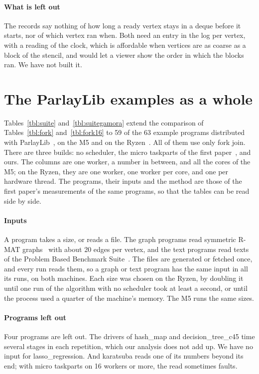 \documentclass[sigplan,nonacm]{acmart}
\begin{document}
\paragraph{What is left out}
%
The records say nothing of how long a ready vertex stays in a deque
before it starts, nor of which vertex ran when.
%
Both need an entry in the log per vertex, with a reading of the
clock, which is affordable when vertices are as coarse as a block of
the stencil, and would let a viewer show the order in which the
blocks ran.
%
We have not built it.


\section{The ParlayLib examples as a whole}
\label{sec:suite}

Tables~\ref{tbl:suite} and~\ref{tbl:suitegamora} extend the comparison
of Tables~\ref{tbl:fork} and~\ref{tbl:fork16} to 59 of the 63 example
programs distributed with ParlayLib~\cite{blelloch20parlaylib}, on the
M5 and on the
Ryzen~\cite{flexibench-dag-suite,flexibench-dag-suite-gamora}.
%
All of them use only fork join.
%
There are three builds: no scheduler, the micro taskparts of the first
paper~\cite{nativeforkjoin}, and ours.
%
The columns are one worker, a number in between, and all the cores of
the M5; on the Ryzen, they are one worker, one worker per core, and
one per hardware thread.
%
The programs, their inputs and the method are those of the first
paper's measurements of the same programs, so that the tables can be
read side by side.

\paragraph{Inputs}
%
A program takes a size, or reads a file.
%
The graph programs read symmetric R-MAT
graphs~\cite{chakrabarti2004rmat} with about 20 edges per vertex, and
the text programs read texts of the Problem Based Benchmark
Suite~\cite{shun2012pbbs}.
%
The files are generated or fetched once, and every run reads them, so
a graph or text program has the same input in all its runs, on both
machines.
%
Each size was chosen on the Ryzen, by doubling it until one run of the
algorithm with no scheduler took at least a second, or until the
process used a quarter of the machine's memory.
%
The M5 runs the same sizes.

\paragraph{Programs left out}
%
Four programs are left out.
%
The drivers of hash\_map and decision\_tree\_c45 time several stages
in each repetition, which our analysis does not add up.
%
We have no input for lasso\_regression.
%
And karatsuba reads one of its numbers beyond its end; with micro
taskparts on 16 workers or more, the read sometimes faults.
\end{document}
